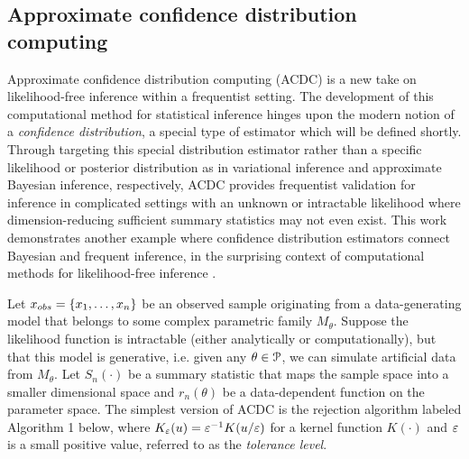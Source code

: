 
\subsection{Approximate confidence distribution computing}
Approximate confidence distribution computing (ACDC) is a new take on likelihood-free inference within a frequentist setting. The development of this computational method for statistical inference hinges upon the modern notion of a {\it confidence distribution}, a special type of estimator which will be defined shortly. Through targeting this special distribution estimator rather than a specific likelihood or posterior distribution as in variational inference and approximate Bayesian inference, respectively, ACDC provides frequentist validation for inference in complicated settings with an unknown or intractable likelihood where dimension-reducing sufficient summary statistics may not even exist. This work demonstrates another example where confidence distribution estimators connect Bayesian and frequent inference, in the surprising context of computational methods for likelihood-free inference \cite{Xie2013, Thornton2022}.  
	

Let $x_{\rm obs} = \{x_1, \dots, x_n\}$ be an observed sample originating from a data-generating model that belongs to some complex parametric family $M_{\theta}$. Suppose the likelihood function is intractable (either analytically or computationally), but that this model is generative, i.e. given any $\theta \in \P$, we can simulate artificial data from $M_{\theta}$. Let $S_n(\cdot)$ be a summary statistic that maps the sample space into a smaller dimensional space and $r_{n}(\theta)$ be a data-dependent function on the parameter space. The simplest version of ACDC is the rejection algorithm labeled Algorithm 1 below, where $K_{\veps}(u) = \veps^{-1}K(u/ \veps)$ for a kernel function $K(\cdot)$ and $\veps$ is a small positive value, referred to as the {\it tolerance level}. 


	


\noindent
\hrulefill
\vspace{-3mm}

